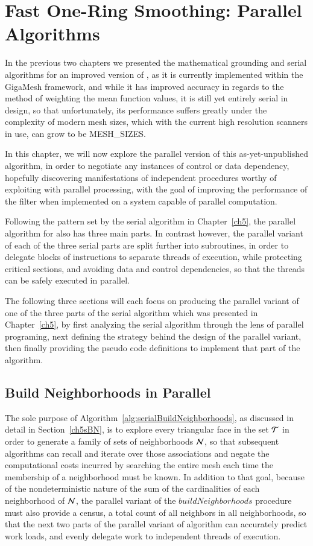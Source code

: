 \chapter{Fast One-Ring Smoothing: Parallel Algorithms}
\label{ch6}
In the previous two chapters we presented the mathematical grounding and serial algorithms for an improved version of , as it is currently implemented within the GigaMesh framework, and while it has improved accuracy in regards to the method of weighting the mean function values, it is still yet entirely serial in design, so that unfortunately, its performance suffers greatly under the complexity of modern mesh sizes, which with the current high resolution scanners in use, can grow to be MESH\_SIZES. 

In this chapter, we will now explore the parallel version of this as-yet-unpublished algorithm, in order to negotiate any instances of control or data dependency, hopefully discovering manifestations of independent procedures worthy of exploiting with parallel processing, with the goal of improving the performance of the filter when implemented on a system capable of parallel computation.

Following the pattern set by the serial algorithm in Chapter~\ref{ch5}, the parallel algorithm for  also has three main parts. In contrast however, the parallel variant of each of the three serial parts are split further into subroutines, in order to delegate blocks of instructions to separate threads of execution, while protecting critical sections, and avoiding data and control dependencies, so that the threads can be safely executed in parallel.

The following three sections will each focus on producing the parallel variant of one of the three parts of the serial algorithm which was presented in Chapter~\ref{ch5}, by first analyzing the serial algorithm through the lens of parallel programing, next defining the strategy behind the design of the parallel variant, then finally providing the pseudo code definitions to implement that part of the algorithm. 

%
%
%
%
\section{Build Neighborhoods in Parallel}
\label{ch6sBNP}
The sole purpose of Algorithm~\ref{alg:serialBuildNeighborhoods}, as discussed in detail in Section~\ref{ch5sBN}, is to explore every triangular face in the set $\mathcal{T}$ in order to generate a family of sets of neighborhoods $\mathcal{N}$, so that subsequent algorithms can recall and iterate over those associations and negate the computational costs incurred by searching the entire mesh each time the membership of a neighborhood must be known. In addition to that goal, because of the nondeterministic nature of the sum of the cardinalities of each neighborhood of $\mathcal{N}$, the parallel variant of the $\mathit{buildNeighborhoods}$ procedure must also provide a census, a total count of all neighbors in all neighborhoods, so that the next two parts of the parallel variant of  algorithm can accurately predict work loads, and evenly delegate work to independent threads of execution.


